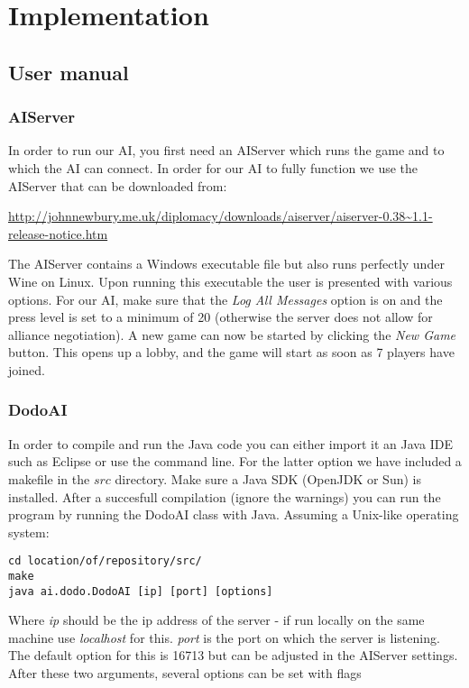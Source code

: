\documentclass[a4paper]{article} %
\begin{document}
\section{Implementation}
\subsection{User manual}

\subsubsection{AIServer}
In order to run our AI, you first need an AIServer which runs the game and to which the AI can connect. In order for our AI to fully function we use the AIServer that can be downloaded from: 

\begin{sloppypar}
\noindent\url{http://johnnewbury.me.uk/diplomacy/downloads/aiserver/aiserver-0.38~1.1-release-notice.htm}
\end{sloppypar}

The AIServer contains a Windows executable file but also runs perfectly under Wine on Linux. Upon running this executable the user is presented with various options. For our AI, make sure that the \textit{Log All Messages} option is on and the press level is set to a minimum of 20 (otherwise the server does not allow for alliance negotiation). A new game can now be started by clicking the \textit{New Game} button. This opens up a lobby, and the game will start as soon as 7 players have joined.     

\subsubsection{DodoAI}
In order to compile and run the Java code you can either import it an Java IDE such as Eclipse or use the command line. For the latter option we have included a makefile in the $src$ directory. Make sure a Java SDK (OpenJDK or Sun) is installed. After a succesfull compilation (ignore the warnings) you can run the program by running the DodoAI class with Java. Assuming a Unix-like operating system:       
\begin{lstlisting}[frame=single] 
cd location/of/repository/src/
make
java ai.dodo.DodoAI [ip] [port] [options]
\end{lstlisting}

Where \textit{ip} should be the ip address of the server - if run locally on the same machine use \textit{localhost} for this. \textit{port} is the port on which the server is listening. The default option for this is 16713 but can be adjusted in the AIServer settings. After these two arguments, several options can be set with flags
\end{document}
